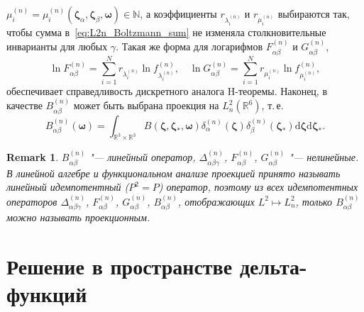 \documentclass{article}
\newtheorem{remark}{Remark}
\newcommand{\dd}{\mathrm{d}}
\newcommand{\dzeta}{\boldsymbol{\dd\zeta}}
\newcommand{\bzeta}{\boldsymbol{\zeta}}
\newcommand{\bomega}{\boldsymbol{\omega}}
\begin{document}
\(\mu^{(n)}_i=\mu^{(n)}_i(\bzeta_\alpha,\bzeta_\beta,\bomega)\in\mathbb{N}\),
а коэффициенты \(r_{\lambda^{(n)}_i}\) и \(r_{\mu^{(n)}_i}\) выбираются так, чтобы сумма в~\eqref{eq:L2n_Boltzmann_sum}
не изменяла столкновительные инварианты для любых \(\gamma\).
Такая же форма для логарифмов \(F^{(n)}_{\alpha\beta}\) и \(G^{(n)}_{\alpha\beta}\),
\begin{equation}\label{htheorem_scheme}
    \ln F^{(n)}_{\alpha\beta} = \sum_{i=1}^N r_{\lambda^{(n)}_i} \ln f^{(n)}_{\lambda^{(n)}_i}, \quad
    \ln G^{(n)}_{\alpha\beta} = \sum_{i=1}^N r_{\mu^{(n)}_i} \ln f^{(n)}_{\mu^{(n)}_i},
\end{equation}
обеспечивает справедливость дискретного аналога H-теоремы.
Наконец, в качестве \(B^{(n)}_{\alpha\beta}\) может быть выбрана проекция на \(L^2_n(\mathbb{R}^6)\), т.\,е.
\begin{equation}\label{B_projection}
    B^{(n)}_{\alpha\beta}(\bomega) = \int_{\mathbb{R}^3\times\mathbb{R}^3} B(\bzeta,\bzeta_*,\bomega)
        \delta^{(n)}_\alpha(\bzeta) \delta^{(n)}_\beta(\bzeta_*) \dzeta\dzeta_*.
\end{equation}
\begin{remark}
    \(B^{(n)}_{\alpha\beta}\) "--- линейный оператор,
    \(\Delta^{(n)}_{\alpha\beta\gamma}\), \(F^{(n)}_{\alpha\beta}\), \(G^{(n)}_{\alpha\beta}\) "--- нелинейные.
    В линейной алгебре и функциональном анализе проекцией принято называть линейный идемпотентный (\(P^2=P\)) оператор,
    поэтому из всех идемпотентных операторов
    \(\Delta^{(n)}_{\alpha\beta\gamma}\), \(F^{(n)}_{\alpha\beta}\), \(G^{(n)}_{\alpha\beta}\), \(B^{(n)}_{\alpha\beta}\),
    отображающих \(L^2 \mapsto L^2_n\), только \(B^{(n)}_{\alpha\beta}\) можно называть проекционным.
\end{remark}

\section{Решение в пространстве дельта-функций}
\end{document}
